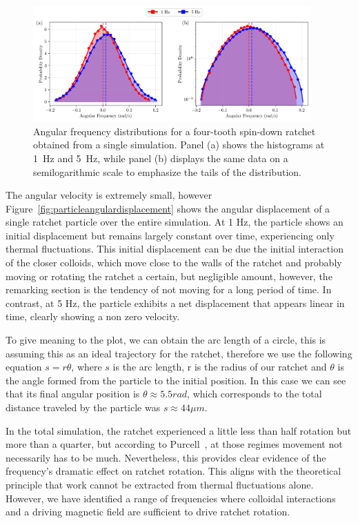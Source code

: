\begin{figure}[h!]
  \begin{center}
    \includegraphics[width=0.95\textwidth]{figures/histogram_comparison.pdf}
  \end{center}
  \caption[Histogram of angular frequency.]{Angular frequency distributions for a four-tooth spin-down ratchet obtained from a single simulation. Panel (a) shows the histograms at 1~Hz and 5~Hz, while panel (b) displays the same data on a semilogarithmic scale to emphasize the tails of the distribution.}
  \label{fig:histogram}
\end{figure}

The angular velocity is extremely small, however Figure~\ref{fig:particleangulardisplacement} shows the angular displacement of a single ratchet particle over the entire simulation. At 1 Hz, the particle shows an initial displacement but remains largely constant over time, experiencing only thermal fluctuations. This initial displacement can be due the initial interaction of the closer colloids, which move close to the walls of the ratchet and probably moving or rotating the ratchet a certain, but negligible amount, however, the remarking section is the tendency of not moving for a long period of time. In contrast, at 5 Hz, the particle exhibits a net displacement that appears linear in time, clearly showing a non zero velocity.

To give meaning to the plot, we can obtain the arc length of a circle, this is assuming this as an ideal trajectory for the ratchet, therefore we use the following equation $s = r\theta$, where $s$ is the arc length, r is the radius of our ratchet and $\theta$ is the angle formed from the particle to the initial position.
In this case we can see that its final angular position is $\theta \approx 5.5 rad$, which corresponds to the total distance traveled by the particle was $s \approx 44 \mu m$.

In the total simulation, the ratchet experienced a little less than half rotation but more than a quarter, but according to Purcell~\cite{purcell2014life}, at those regimes movement not necessarily has to be much. Nevertheless, this provides clear evidence of the frequency's dramatic effect on ratchet rotation. This aligns with the theoretical principle that work cannot be extracted from thermal fluctuations alone. However, we have identified a range of frequencies where colloidal interactions and a driving magnetic field are sufficient to drive ratchet rotation.


